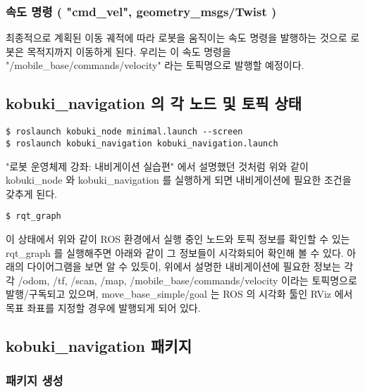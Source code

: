 \subsubsection{속도 명령 ( "cmd\_vel", geometry\_msgs/Twist )}
최종적으로 계획된 이동 궤적에 따라 로봇을 움직이는 속도 명령을 발행하는 것으로 로봇은 목적지까지 이동하게 된다. 우리는 이 속도 명령을 "/mobile\_base/commands/velocity" 라는 토픽명으로 발행할 예정이다.


\subsection{kobuki\_navigation 의 각 노드 및 토픽 상태}

\vspace{\baselineskip}
\begin{lstlisting}[language=ROS]
$ roslaunch kobuki_node minimal.launch --screen
$ roslaunch kobuki_navigation kobuki_navigation.launch
\end{lstlisting}


"로봇 운영체제 강좌: 내비게이션 실습편" 에서 설명했던 것처럼 위와 같이 kobuki\_node 와 kobuki\_navigation 를 실행하게 되면 내비게이션에 필요한 조건을 갖추게 된다. 

\vspace{\baselineskip}
\begin{lstlisting}[language=ROS]
$ rqt_graph
\end{lstlisting}

이 상태에서 위와 같이 ROS 환경에서 실행 중인 노드와 토픽 정보를 확인할 수 있는 rqt\_graph 를 실행해주면 아래와 같이 그 정보들이 시각화되어 확인해 볼 수 있다. 아래의 다이어그램을 보면 알 수 있듯이, 위에서 설명한 내비게이션에 필요한 정보는 각각 /odom, /tf,  /scan, /map, /mobile\_base/commands/velocity 이라는 토픽명으로 발행/구독되고 있으며, move\_base\_simple/goal 는 ROS 의 시각화 툴인 RViz 에서 목표 좌표를 지정할 경우에 발행되게 되어 있다.

\subsection{kobuki\_navigation 패키지}

\subsubsection{패키지 생성}

